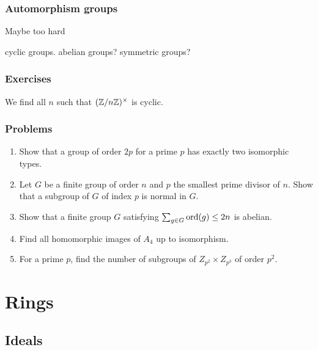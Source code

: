 \documentclass{../../large}
\begin{document}
\section{Automorphism groups}
Maybe too hard

cyclic groups.
abelian groups?
symmetric groups?




\section*{Exercises}

\begin{prb}
We find all $n$ such that $(\mathbb{Z}/n\mathbb{Z})^\times$ is cyclic.
\end{prb}




\section*{Problems}

\begin{enumerate}
\item Show that a group of order $2p$ for a prime $p$ has exactly two isomorphic types.
\item Let $G$ be a finite group of order $n$ and $p$ the smallest prime divisor of $n$. Show that a subgroup of $G$ of index $p$ is normal in $G$.
\item Show that a finite group $G$ satisfying $\sum_{g\in G}\operatorname{ord}(g)\le2n$ is abelian.
\item Find all homomorphic images of $A_4$ up to isomorphism.
\item For a prime $p$, find the number of subgroups of $Z_{p^2}\times Z_{p^3}$ of order $p^2$.
\end{enumerate}







\part{Rings}
\chapter{Ideals}
\end{document}
